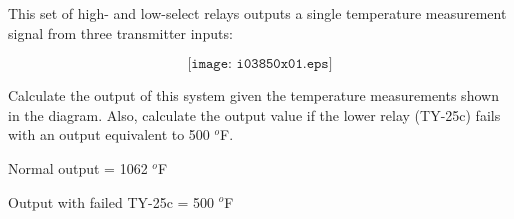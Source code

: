 

This set of high- and low-select relays outputs a single temperature measurement signal from three transmitter inputs:

$$\texttt{[image: i03850x01.eps]}$$

Calculate the output of this system given the temperature measurements shown in the diagram.  Also, calculate the output value if the lower relay (TY-25c) fails with an output equivalent to 500 $^{o}$F.







Normal output = 1062 $^{o}$F

\vskip 10pt

Output with failed TY-25c = 500 $^{o}$F











